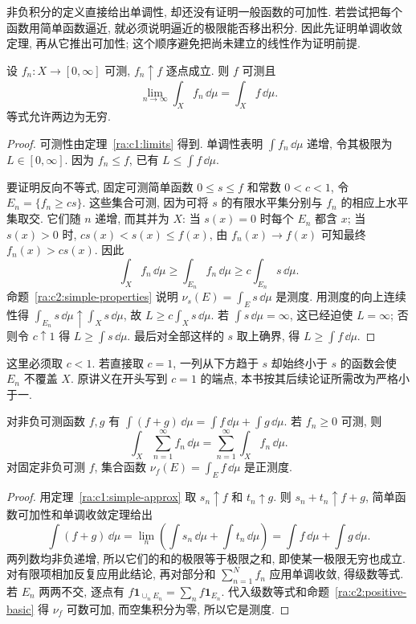非负积分的定义直接给出单调性, 却还没有证明一般函数的可加性. 若尝试把每个函数用简单函数逼近, 就必须说明逼近的极限能否移出积分. 因此先证明单调收敛定理, 再从它推出可加性; 这个顺序避免把尚未建立的线性作为证明前提.

\begin{theorem}[单调收敛定理]\label{ra:c2:mct}
设 $f_n:X\to[0,\infty]$ 可测, $f_n\uparrow f$ 逐点成立. 则 $f$ 可测且
\[
 \lim_{n\to\infty}\int_Xf_n\,\dd\mu=\int_Xf\,\dd\mu.
\]
等式允许两边为无穷.
\end{theorem}
\begin{proof}
可测性由定理~\ref{ra:c1:limits} 得到. 单调性表明 $\int f_n\,\dd\mu$ 递增, 令其极限为 $L\in[0,\infty]$. 因为 $f_n\le f$, 已有 $L\le\int f\,\dd\mu$.

要证明反向不等式, 固定可测简单函数 $0\le s\le f$ 和常数 $0<c<1$, 令 $E_n=\{f_n\ge cs\}$. 这些集合可测, 因为可将 $s$ 的有限水平集分别与 $f_n$ 的相应上水平集取交. 它们随 $n$ 递增, 而其并为 $X$: 当 $s(x)=0$ 时每个 $E_n$ 都含 $x$; 当 $s(x)>0$ 时, $cs(x)<s(x)\le f(x)$, 由 $f_n(x)\to f(x)$ 可知最终 $f_n(x)>cs(x)$. 因此
\[
 \int_X f_n\,\dd\mu\ge\int_{E_n}f_n\,\dd\mu
 \ge c\int_{E_n}s\,\dd\mu.
\]
命题~\ref{ra:c2:simple-properties} 说明 $\nu_s(E)=\int_Es\,\dd\mu$ 是测度. 用测度的向上连续性得 $\int_{E_n}s\,\dd\mu\uparrow\int_Xs\,\dd\mu$, 故 $L\ge c\int_Xs\,\dd\mu$. 若 $\int s\,\dd\mu=\infty$, 这已经迫使 $L=\infty$; 否则令 $c\uparrow1$ 得 $L\ge\int s\,\dd\mu$. 最后对全部这样的 $s$ 取上确界, 得 $L\ge\int f\,\dd\mu$.
\end{proof}
这里必须取 $c<1$. 若直接取 $c=1$, 一列从下方趋于 $s$ 却始终小于 $s$ 的函数会使 $E_n$ 不覆盖 $X$. 原讲义在开头写到 $c=1$ 的端点, 本书按其后续论证所需改为严格小于一.

\begin{corollary}\label{ra:c2:nonnegative-additive}
对非负可测函数 $f,g$ 有 $\int(f+g)\,\dd\mu=\int f\,\dd\mu+\int g\,\dd\mu$. 若 $f_n\ge0$ 可测, 则
\[
 \int_X\sum_{n=1}^{\infty}f_n\,\dd\mu
 =\sum_{n=1}^{\infty}\int_Xf_n\,\dd\mu.
\]
对固定非负可测 $f$, 集合函数 $\nu_f(E)=\int_Ef\,\dd\mu$ 是正测度.
\end{corollary}
\begin{proof}
用定理~\ref{ra:c1:simple-approx} 取 $s_n\uparrow f$ 和 $t_n\uparrow g$. 则 $s_n+t_n\uparrow f+g$, 简单函数可加性和单调收敛定理给出
\[
 \int(f+g)\,\dd\mu
 =\lim_n\left(\int s_n\,\dd\mu+\int t_n\,\dd\mu\right)
 =\int f\,\dd\mu+\int g\,\dd\mu.
\]
两列数均非负递增, 所以它们的和的极限等于极限之和, 即使某一极限无穷也成立. 对有限项相加反复应用此结论, 再对部分和 $\sum_{n=1}^{N}f_n$ 应用单调收敛, 得级数等式. 若 $E_n$ 两两不交, 逐点有 $f\mathbf1_{\cup_nE_n}=\sum_nf\mathbf1_{E_n}$. 代入级数等式和命题~\ref{ra:c2:positive-basic} 得 $\nu_f$ 可数可加, 而空集积分为零, 所以它是测度.
\end{proof}

